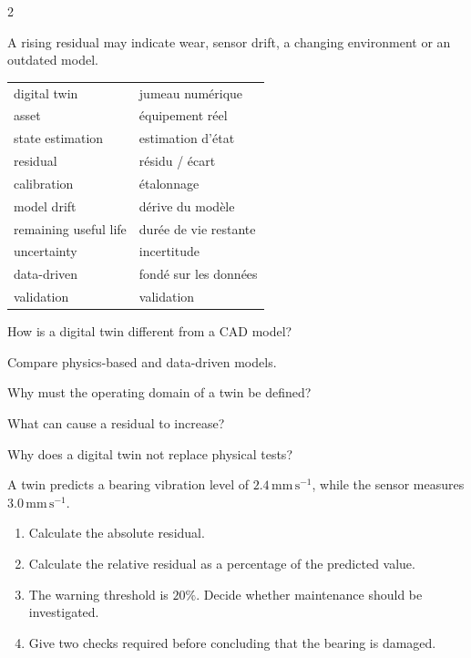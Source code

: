 \begin{multicols}{2}
\begin{tcolorbox}[title=\sffamily\bfseries Prediction error over time,colback=white,colframe=ECBlue]
\begin{center}
\end{center}
\footnotesize A rising residual may indicate wear, sensor drift, a changing environment or an outdated model.
\end{tcolorbox}

\begin{vocabulary}
\begin{tabularx}{\linewidth}{@{}lX@{}}
digital twin & jumeau numérique\\
asset & équipement réel\\
state estimation & estimation d'état\\
residual & résidu / écart\\
calibration & étalonnage\\
model drift & dérive du modèle\\
remaining useful life & durée de vie restante\\
uncertainty & incertitude\\
data-driven & fondé sur les données\\
validation & validation
\end{tabularx}
\end{vocabulary}

\begin{questions}
\item How is a digital twin different from a CAD model?
\item Compare physics-based and data-driven models.
\item Why must the operating domain of a twin be defined?
\item What can cause a residual to increase?
\item Why does a digital twin not replace physical tests?
\end{questions}

\begin{applicationexercise}
A twin predicts a bearing vibration level of $2.4\,\mathrm{mm\,s^{-1}}$, while the sensor measures
$3.0\,\mathrm{mm\,s^{-1}}$.
\begin{enumerate}
\item Calculate the absolute residual.
\item Calculate the relative residual as a percentage of the predicted value.
\item The warning threshold is $20\%$. Decide whether maintenance should be investigated.
\item Give two checks required before concluding that the bearing is damaged.
\end{enumerate}
\end{applicationexercise}


\end{multicols}
